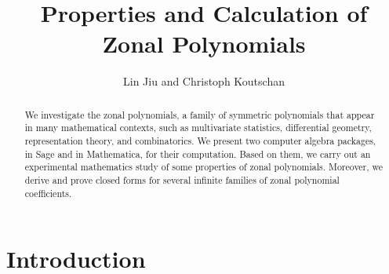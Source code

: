 \documentclass[10pt,oneside,american]{amsart}
\numberwithin{equation}{section}
\numberwithin{figure}{section}
\theoremstyle{plain}
\theoremstyle{definition}
\theoremstyle{remark}
\theoremstyle{plain}
\theoremstyle{definition}
\theoremstyle{plain}
\theoremstyle{plain}
\begin{document}
\title{Properties and Calculation of Zonal Polynomials}

\author{Lin Jiu and Christoph Koutschan}
\begin{abstract}
  We investigate the zonal polynomials, a family of symmetric polynomials that
  appear in many mathematical contexts, such as multivariate statistics,
  differential geometry, representation theory, and combinatorics.  We present
  two computer algebra packages, in Sage and in Mathematica, for their
  computation. Based on them, we carry out an experimental mathematics study
  of some properties of zonal polynomials. Moreover, we derive and prove
  closed forms for several infinite families of zonal polynomial coefficients.
\end{abstract}

\maketitle

\section{Introduction}
\end{document}
